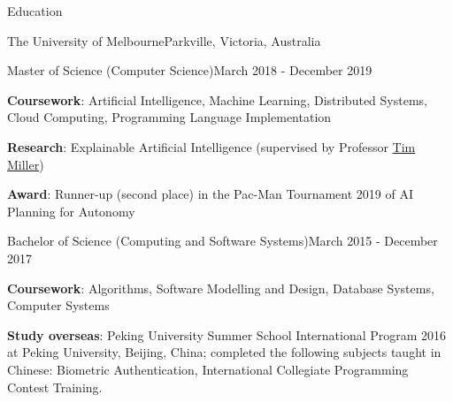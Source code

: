 \documentclass{xsha}
\begin{document}
\address{
\textbf{Phone} +86 136******** $\cdot$\space
\textbf{Email} \href{mailto:luo@jiahai.co}{luo@jiahai.co} $\cdot$\space
\textbf{LinkedIn} \href{https://linkedin.com/in/luojiahai/}{in/luojiahai} $\cdot$\space
\textbf{GitHub} \href{https://github.com/luojiahai/}{luojiahai} $\cdot$\space
\textbf{Site} \href{https://luojiahai.com/}{luojiahai.com}
}

\begin{xsection}{Education}

\begin{xheading}{The University of Melbourne}{Parkville, Victoria, Australia}
\begin{xsubheading}{Master of Science (Computer Science)}{March 2018 - December 2019}
\item \textbf{Coursework}: Artificial Intelligence, Machine Learning, Distributed Systems, Cloud Computing, Programming Language Implementation
\item \textbf{Research}: Explainable Artificial Intelligence (supervised by Professor \href{https://eecs.uq.edu.au/profile/9477/tim-miller}{Tim Miller})
\item \textbf{Award}: Runner-up (second place) in the Pac-Man Tournament 2019 of AI Planning for Autonomy
\end{xsubheading}
\begin{xsubheading}{Bachelor of Science (Computing and Software Systems)}{March 2015 - December 2017}
\item \textbf{Coursework}: Algorithms, Software Modelling and Design, Database Systems, Computer Systems
\item \textbf{Study overseas}: Peking University Summer School International Program 2016 at Peking University, Beijing, China; completed the following subjects taught in Chinese: Biometric Authentication, International Collegiate Programming Contest Training.
\end{xsubheading}
\end{xheading}

\end{xsection}
\end{document}
